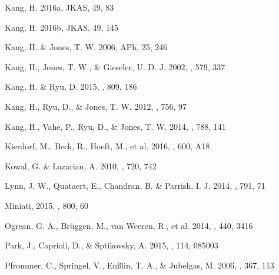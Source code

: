 \documentclass[twocolumn]{aastex61}
\begin{document}
\begin{thebibliography}{}
Kang, H. 2016a,
JKAS, 49, 83

Kang, H. 2016b,
JKAS, 49, 145

Kang, H. \& Jones, T. W. 2006,
APh, 25, 246

Kang, H., Jones, T. W., \& Gieseler, U. D. J. 2002,
\apj, 579, 337

Kang, H. \& Ryu, D. 2015,
\apj, 809, 186

Kang, H., Ryu, D., \& Jones, T. W. 2012,
\apj, 756, 97

Kang, H., Vahe, P., Ryu, D., \& Jones, T. W. 2014,
\apj, 788, 141

Kierdorf, M., Beck, R., Hoeft, M., et al. 2016,
\aap, 600, A18

Kowal, G. \& Lazarian, A. 2010,
\apj, 720, 742

Lynn, J. W., Quataert, E., Chandran, B. \& Parrish, I. J. 2014,
\apj, 791, 71

Miniati, 2015,
\apj, 800, 60

Ogrean, G. A., Br{\"u}ggen, M., van Weeren, R., et al. 2014,
\mnras, 440, 3416

Park, J., Caprioli, D., \& Sptikovsky, A. 2015,
\prl, 114, 085003

Pfrommer, C., Springel, V., En{\ss}lin, T. A., \& Jubelgas, M. 2006,
\mnras, 367, 113 


\end{thebibliography}
\end{document}
